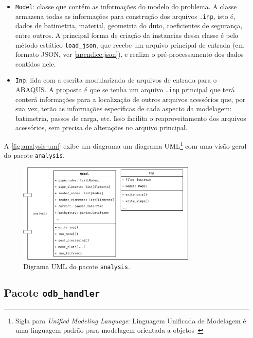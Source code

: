 \begin{itemize}
    \item \texttt{Model}: classe que contém as informações do modelo do problema.
    A classe armazena todas as informações para construção dos arquivos \texttt{.inp}, isto é, dados de batimetria, material, geometria do duto, coeficientes de segurança, entre outros.
    A principal forma de criação da instancias dessa classe é pelo método estático \texttt{load\_json}, que recebe um arquivo principal de entrada (em formato JSON, ver \autoref{apendice:json}), e realiza o pré-processamento dos dados contídos nele.

    \item \texttt{Inp}: lida com a escrita modularizada de arquivos de entrada  para o ABAQUS. A proposta é que se tenha um arquivo \texttt{.inp} principal que terá conterá informações para a localização de outros arquivos acessórios que, por sua vez, terão as informações específicas de cada aspecto da modelagem: batimetria, passos de carga, etc. Isso facilita o reaproveitamento dos arquivos acessórios, sem precisa de alterações no arquivo principal.
\end{itemize}

A \autoref{fig:analysis-uml} exibe um diagrama um diagrama UML\footnote{Sigla para \textit{Unified Modeling Language}: Linguagem Unificada de Modelagem é uma linguagem padrão para modelagem orientada a objetos~\cite{infoescolauml}} com uma visão geral do pacote \texttt{analysis}.

\begin{figure}[!ht]
    \centering
    \caption{Digrama UML do pacote \texttt{analysis}.}\label{fig:analysis-uml}
    \includegraphics[width=0.8\textwidth]{imagens/analysis-uml}
\end{figure}


\subsection{Pacote \texttt{odb\_handler}}


